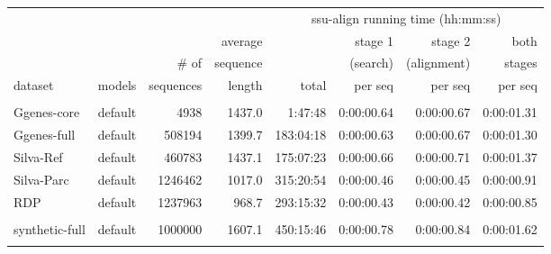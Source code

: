 \begin{table}[hb]
\begin{center}
  \small
  \begin{tabular}{llrr|rrrr} 
                &          &         &        &  \multicolumn{4}{c}{ssu-align running time (hh:mm:ss)} \\ \cline{5-8}
                &          &         &average &           & stage 1      & stage 2      & both   \\ 
                &          &\# of    &sequence&           & (search)     & (alignment)  & stages \\ 
dataset         & models   &sequences& length & total     & per seq      & per seq      & per seq     \\ \hline
& & & & & & & \\
Ggenes-core     & default  &    4938 & 1437.0 &   1:47:48 &   0:00:00.64 &   0:00:00.67 &   0:00:01.31 \\
Ggenes-full     & default  &  508194 & 1399.7 & 183:04:18 &   0:00:00.63 &   0:00:00.67 &   0:00:01.30 \\
Silva-Ref       & default  &  460783 & 1437.1 & 175:07:23 &   0:00:00.66 &   0:00:00.71 &   0:00:01.37 \\
Silva-Parc      & default  & 1246462 & 1017.0 & 315:20:54 &   0:00:00.46 &   0:00:00.45 &   0:00:00.91 \\
RDP             & default  & 1237963 &  968.7 & 293:15:32 &   0:00:00.43 &   0:00:00.42 &   0:00:00.85 \\
& & & & & & & \\
synthetic-full  & default  & 1000000 & 1607.1 & 450:15:46 &   0:00:00.78 &   0:00:00.84 &   0:00:01.62 \\
& & & & & & & \\

\end{tabular}
\end{center}
\end{table}
